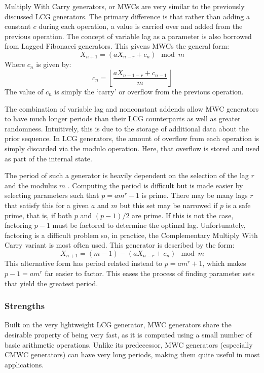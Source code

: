 \def\lc{\left\lfloor}
\def\rc{\right\rfloor}

Multiply With Carry generators, or MWCs are very similar to the previously discussed LCG generators. The primary difference is that rather than adding a constant $c$ during each operation, a value is carried over and added from the previous operation. The concept of variable lag as a parameter is also borrowed from Lagged Fibonacci generators. This givens MWCs the general form:
\begin{equation} \label{eq:mwc}
    X_{n+1} = (aX_{n-r} + c_n) \mod m
\end{equation}
Where $c_n$ is given by:
\begin{equation} \label{eq:mwc_c}
    c_n = \lc \frac{aX_{n-1-r} + c_{n-1}}{m} \rc
\end{equation}
The value of $c_n$ is simply the `carry' or overflow from the previous operation.

The combination of variable lag and nonconstant addends allow MWC generators to have much longer periods than their LCG counterparts as well as greater randomness. Intuitively, this is due to the storage of additional data about the prior sequence. In LCG generators, the amount of overflow from each operation is simply discarded via the modulo operation. Here, that overflow is stored and used as part of the internal state.

The period of such a generator is heavily dependent on the selection of the lag $r$ and the modulus $m$ \cite{Marsaglia:2003:SRN:769800.769827,marsaglia2003random}. Computing the period is difficult but is made easier by selecting parameters such that $p=am^r-1$ is prime. There may be many lags $r$ that satisfy this for a given $a$ and $m$ but this set may be narrowed if $p$ is a safe prime, that is, if both $p$ and $(p-1)/2$ are prime. If this is not the case, factoring $p-1$ must be factored to determine the optimal lag. Unfortunately, factoring is a difficult problem so, in practice, the Complementary Multiply With Carry variant is most often used. This generator is described by the form:
\begin{equation} \label{eq:cmwc}
    X_{n+1} = (m-1) - (aX_{n-r} + c_n) \mod m
\end{equation}
This alternative form has period related instead to $p=am^r+1$, which makes $p-1 = am^r$ far easier to factor. This eases the process of finding parameter sets that yield the greatest period.

\subsubsection{Strengths}
Built on the very lightweight LCG generator, MWC generators share the desirable property of being very fast, as it is computed using a small number of basic arithmetic operations. Unlike its predecessor, MWC generators (especially CMWC generators) can have very long periods, making them quite useful in most applications.

